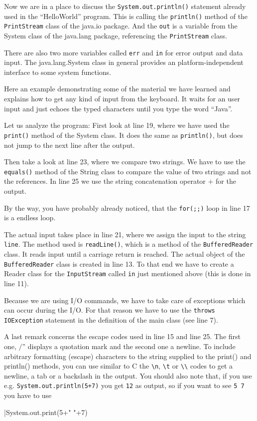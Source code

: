 Now we are in a place to discuss the \verb|System.out.println()| statement
already used in the ``HelloWorld'' program. This is calling the
\verb|println()| method of the \verb|PrintStream| class of the java.io 
package. And the \verb|out| is a variable from the System 
class of the java.lang package, referencing the \verb|PrintStream| class. 

There are also two more variables called \verb|err| and
\verb|in| for error output and data input. 
The java.lang.System class in general provides an platform-independent 
interface to some system functions.

Here an example demonstrating some of the material we have learned and
explains how to get any kind of input from the keyboard.
It waits for an user input and just echoes the typed characters
until you type the word ``Java''. 


Let us analyze the program:
First look at line 19, where we have used the \verb|print()| method
of the System class. It does the same as \verb|println()|, but does not
jump to the next line after the output.

Then take a look at line 23, where we compare two strings. 
We have to use the \verb|equals()| method of the String class to
compare the value of two strings and not the references. 
In line 25 we use the string concatenation operator $+$ for the output.

By the way, you have probably already noticed, that 
the \verb|for(;;)| loop in line 17 is a endless loop.

The actual input takes place in line 21, where we assign the input
to the string \verb|line|. The method used is \verb|readLine()|, which
is a method of the \verb|BufferedReader| class. It reads input until
a carriage return is reached. The actual object of the 
\verb|BufferedReader| class is created in line 13. To that end we have
to create a Reader class for the \verb|InputStream| called \verb|in|
just mentioned above (this is done in line 11).

Because we are using I/O commands, we have to take care of exceptions
which can occur during the I/O. For that reason we have to use the
\verb|throws IOException| statement in the definition of the main
class (see line 7).

A last remark concerns the escape codes used in line 15 and line 25.
The first one, $/$'' displays a quotation mark and the second
one a newline.
To include arbitrary formatting (escape) characters
to the string supplied to the print() and println() methods, you
can use similar to C the \verb|\n|, \verb|\t| or \verb|\\| codes
to get a newline, a tab or a backslash in the output. You should 
also note that, if you use e.g. \verb|System.out.println(5+7)| you
get \verb|12| as output, so if you want to see \verb|5 7| you have
to use 
\begin{sverbatim}
|System.out.print(5+" "+7)
\end{sverbatim}

